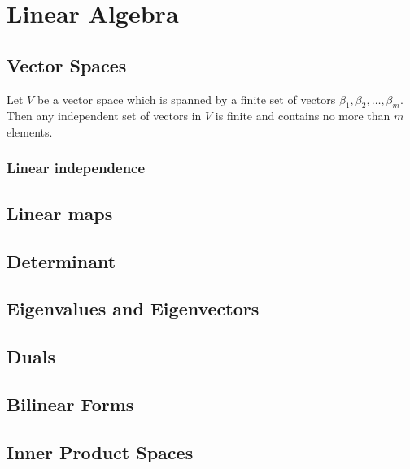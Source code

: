 \documentclass[main.tex]{subfiles}
\begin{document}
	\chapter{Linear Algebra}
		\section{Vector Spaces}
		
		\begin{theorem}
		Let $V$ be a vector space which is spanned by a finite set of vectors $\beta_1, \beta_2, \ldots, \beta_m$. Then any independent set of vectors in $V$ is finite and contains no more than $m$ elements.
		\end{theorem}

			\subsection{Linear independence}
		
		\section{Linear maps}
		
		\section{Determinant}
		
		\section{Eigenvalues and Eigenvectors}
		
		\section{Duals}
		
		\section{Bilinear Forms}
		
		\section{Inner Product Spaces}
		
\end{document}
